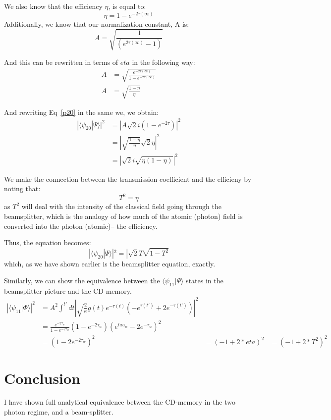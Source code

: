 \documentclass[12pt]{article}
\begin{document}
We also know that the efficiency $\eta$, is equal to:
\begin{equation}
\eta = 1-e^{-2\tau(\infty)}
\end{equation}
Additionally, we know that our normalization constant, A is:
\begin{equation}
A = \sqrt{\frac{1}{\left(  e^{2\tau(\infty)} -1\right)}}
\end{equation}

And this can be rewritten in terms of $eta$ in the following way:
\begin{align}
A &= \sqrt{\frac{e^{-2\tau(\infty)}}{1-e^{-2\tau(\infty)}}}\\
A &=\sqrt{ \frac{1-\eta}{\eta}}
\end{align}

And rewriting Eq~\eqref{p20} in the same we, we obtain:
\begin{align}
|\langle \psi_{20}| \Psi \rangle|^2&= |A  \sqrt{2} i (1-e^{-2\tau})|^2\\
&=| \sqrt{\frac{1-\eta}{\eta}} \sqrt{2} \eta|^2\\ 
&= |  \sqrt{2} i \sqrt{ \eta (1-\eta)}|^2
\end{align}

We make the connection between the transmission coefficient and the efficieny by noting that:
\[
T^2 = \eta
\]
as $T^2$ will deal with the intensity of the classical field going through the beamsplitter, which is the analogy of how much of the atomic (photon) field is converted into the photon (atomic)-- the efficiency.

Thus, the equation becomes:
\[
|\langle \psi_{20} | \Psi \rangle|^2 = | \sqrt{2} T\sqrt{1-T^2}
\]
which, as we have shown earlier is the beamsplitter equation, exactly.

Similarly, we can show the equivalence between the $\langle \psi_{11} | \Psi \rangle$ states in the beamsplitter picture and the CD memory.
\begin{align}
\left | \langle \psi_{11} | \Phi \rangle \right | ^2  &= A^2\int^{t'} dt \left|\sqrt{\frac{2}{\kappa}} g(t) e^{-\tau(t)} \left (- e^{\tau(t')} +2 e^{-\tau(t')} \right ) \right |^2 \\
&= \frac{e^{-2\tau_w}}{1-e^{-2\tau_w}} \left (1- e^{-2\tau_w} \right ) \left ( e^{tau_w}-2e^{-\tau_w} \right )^2\\
&=  \left( 1-2e^{-2\tau_w} \right )^2
&= \left ( -1+2*eta \right )^2
&= \left (-1+2*T^2 \right )^2
\end{align}

\section{Conclusion}
I have shown full analytical equivalence between the CD-memory in the two photon regime, and a beam-splitter.
\end{document}
